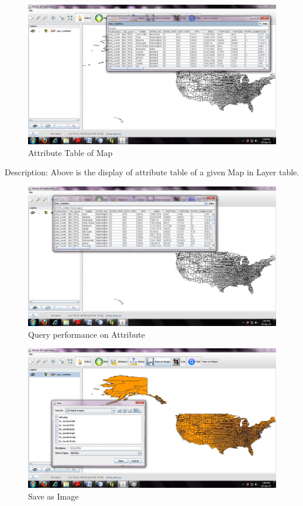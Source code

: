 \begin{figure}[h]
\begin{center}
  \includegraphics[scale=0.43] {8.jpg}
  \caption[Screenshot - Attribute table]{Attribute Table of  Map}
\end{center}
\end{figure}
Description: Above is the display of attribute table of a given Map in Layer  table.
\newpage
\begin{figure}[h]
\begin{center}
  \includegraphics[scale=0.43] {9.jpg}
  \caption[Screenshot - Query]{Query performance on Attribute}
\end{center}
\end{figure}
\newpage
\begin{figure}[h]
\begin{center}
  \includegraphics[scale=0.43] {10.jpg}
  \caption[Screenshot - Save]{Save as Image}
\end{center}
\end{figure}
